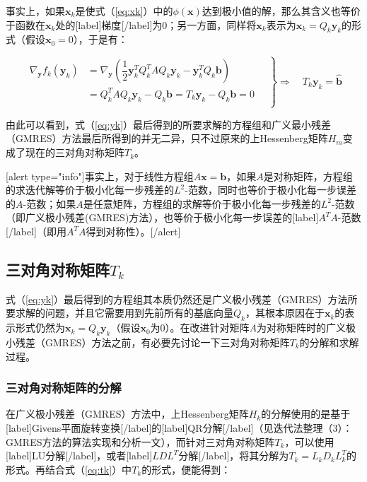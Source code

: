 \documentclass[UTF8,nofonts]{ctexart}
\begin{document}
事实上，如果$\boldsymbol{x}_k$是使式（\ref{eq:xk}）中的$\phi{(\boldsymbol{x})}$达到极小值的解，那么其含义也等价于函数在$\boldsymbol{x}_k$处的[label]梯度[/label]为$0$；另一方面，同样将$\boldsymbol{x}_k$表示为$\boldsymbol{x}_k=Q_k\boldsymbol{y}_k$的形式（假设$\boldsymbol{x}_0=0$），于是有：

\begin{equation}
	\label{eq:yk}
	\left.
		\begin{aligned}
			\nabla_{\boldsymbol{y}}f_k(\boldsymbol{y}_k) &=
			\nabla_{\boldsymbol{y}}\left(
				\dfrac{1}{2}\boldsymbol{y}_k^TQ_k^TAQ_k\boldsymbol{y}_k-\boldsymbol{y}_k^TQ_k\boldsymbol{b}
			\right) \\
			&=Q_k^TAQ_k\boldsymbol{y}_k-Q_k\boldsymbol{b}
			=T_k\boldsymbol{y}_k-Q_k\boldsymbol{b}=0 \\
		\end{aligned}\quad
	\right\}\Longrightarrow\quad
	T_k\boldsymbol{y}_k = \hat{\boldsymbol{b}}
\end{equation}

由此可以看到，式（\ref{eq:yk}）最后得到的所要求解的方程组和广义最小残差（GMRES）方法最后所得到的并无二异，只不过原来的上Hessenberg矩阵$H_m$变成了现在的三对角对称矩阵$T_k$。

[alert type="info"]事实上，对于线性方程组$A\boldsymbol{x}=\boldsymbol{b}$，如果$A$是对称矩阵，方程组的求迭代解等价于极小化每一步残差的$L^2$-范数，同时也等价于极小化每一步误差的$A$-范数；如果$A$是任意矩阵，方程组的求解等价于极小化每一步残差的$L^2$-范数（即广义极小残差(GMRES)方法），也等价于极小化每一步误差的[label]$A^TA$-范数[/label]（即用$A^TA$得到对称性）。[/alert]

\subsection*{三对角对称矩阵$T_k$}

式（\ref{eq:yk}）最后得到的方程组其本质仍然还是广义极小残差（GMRES）方法所要求解的问题，并且它需要用到先前所有的基底向量$Q_k$，其根本原因在于$\boldsymbol{x}_k$的表示形式仍然为$\boldsymbol{x}_k=Q_k\boldsymbol{y}_k$（假设$\boldsymbol{x}_0$为$0$）。在改进针对矩阵$A$为对称矩阵时的广义极小残差（GMRES）方法之前，有必要先讨论一下三对角对称矩阵$T_k$的分解和求解过程。

\subsubsection*{三对角对称矩阵的分解}

在广义极小残差（GMRES）方法中，上Hessenberg矩阵$H_k$的分解使用的是基于[label]Givens平面旋转变换[/label]的[label]QR分解[/label]（见迭代法整理（3）：GMRES方法的算法实现和分析一文），而针对三对角对称矩阵$T_k$，可以使用[label]LU分解[/label]，或者[label]$LDL^T$分解[/label]，将其分解为$T_k=L_kD_kL_k^T$的形式。再结合式（\ref{eq:tk}）中$T_k$的形式，便能得到：
\end{document}

